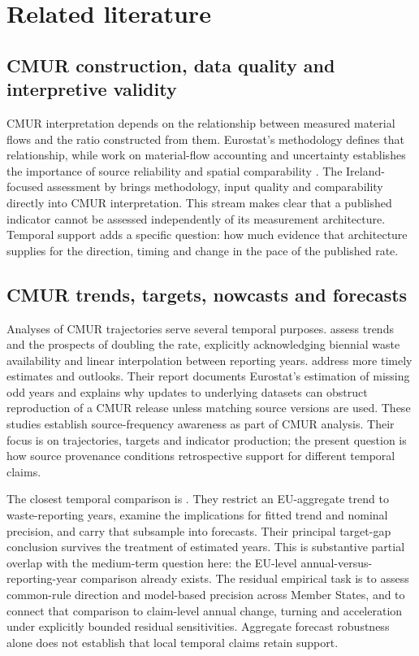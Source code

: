 \section{Related literature}

\subsection{CMUR construction, data quality and interpretive validity}

CMUR interpretation depends on the relationship between measured material flows and the ratio constructed from them. Eurostat's methodology defines that relationship, while work on material-flow accounting and uncertainty establishes the importance of source reliability and spatial comparability \parencite{Eurostat2018,FischerKowalski2011,Patricio2015}. The Ireland-focused assessment by \textcite{McCarthy2024} brings methodology, input quality and comparability directly into CMUR interpretation. This stream makes clear that a published indicator cannot be assessed independently of its measurement architecture. Temporal support adds a specific question: how much evidence that architecture supplies for the direction, timing and change in the pace of the published rate.

\subsection{CMUR trends, targets, nowcasts and forecasts}

Analyses of CMUR trajectories serve several temporal purposes. \textcite{Christis2023} assess trends and the prospects of doubling the rate, explicitly acknowledging biennial waste availability and linear interpolation between reporting years. \textcite{Nuss2024Nowcasting} address more timely estimates and outlooks. Their report documents Eurostat's estimation of missing odd years and explains why updates to underlying datasets can obstruct reproduction of a CMUR release unless matching source versions are used. These studies establish source-frequency awareness as part of CMUR analysis. Their focus is on trajectories, targets and indicator production; the present question is how source provenance conditions retrospective support for different temporal claims.

The closest temporal comparison is \textcite{Haider2026}. They restrict an EU-aggregate trend to waste-reporting years, examine the implications for fitted trend and nominal precision, and carry that subsample into forecasts. Their principal target-gap conclusion survives the treatment of estimated years. This is substantive partial overlap with the medium-term question here: the EU-level annual-versus-reporting-year comparison already exists. The residual empirical task is to assess common-rule direction and model-based precision across Member States, and to connect that comparison to claim-level annual change, turning and acceleration under explicitly bounded residual sensitivities. Aggregate forecast robustness alone does not establish that local temporal claims retain support.

